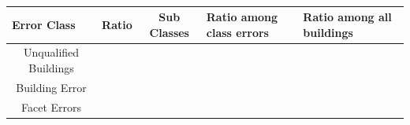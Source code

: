 \documentclass[a4paper, 11pt]{article}
\begin{document}
	\begin{table}[H]
		\centering
		\caption{\label{my-label} }
		\begin{tabular}{|c|c|c|p{2cm}|p{2cm}|}
			\hline
			\multicolumn{1}{|l|}{Error Class}      & Ratio             & Sub Classes & Ratio among class errors & Ratio among all buildings \\ \hline
			\multirow{4}{*}{Unqualified Buildings} & \multirow{4}{*}{} &            &       &       \\ \cline{3-5}
			                                       &                   &            &       &       \\ \cline{3-5}
			                                       &                   &            &       &       \\ \cline{3-5}
			                                       &                   &            &       &       \\ \hline
			\hline
			\multirow{4}{*}{Building Error} & \multirow{4}{*}{} &            &       &       \\ \cline{3-5}
																						 &                   &            &       &       \\ \cline{3-5}
																						 &                   &            &       &       \\ \cline{3-5}
																						 &                   &            &       &       \\ \hline
      \hline
			\multirow{4}{*}{Facet Errors} & \multirow{4}{*}{} &            &       &       \\ \cline{3-5}
																						 &                   &            &       &       \\ \cline{3-5}
																						 &                   &            &       &       \\ \cline{3-5}
																						 &                   &            &       &       \\ \hline
		\end{tabular}
	\end{table}
\end{document}
